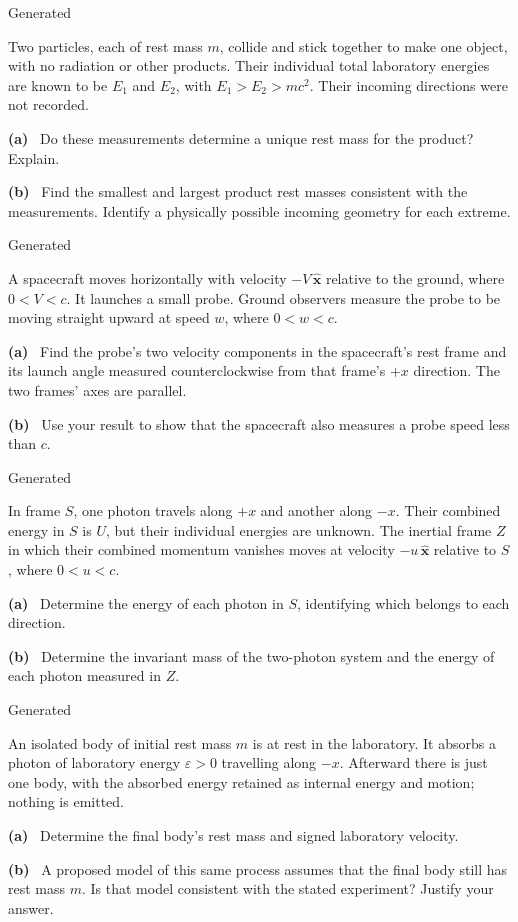 \documentclass[12pt,letterpaper]{article}
\newcommand{\question}[1]{\noindent{\large\bfseries #1.}\hfill{\small Generated}\par\medskip}
\newcommand{\partlabel}[1]{\noindent\textbf{(#1)}\ }
\begin{document}
\question{9}
Two particles, each of rest mass $m$, collide and stick together to make one
object, with no radiation or other products. Their individual total laboratory
energies are known to be $E_1$ and $E_2$, with $E_1>E_2>mc^2$.
Their incoming directions were not recorded.

\partlabel{a} Do these measurements determine a unique rest mass for the
product? Explain.
\vfill

\partlabel{b} Find the smallest and largest product rest masses consistent
with the measurements. Identify a physically possible incoming geometry for
each extreme.
\vfill
\newpage

\question{10}
A spacecraft moves horizontally with velocity $-V\,\hat{\mathbf x}$ relative
to the ground, where $0<V<c$. It launches a small probe. Ground observers
measure the probe to be moving straight upward at speed $w$, where $0<w<c$.

\partlabel{a} Find the probe's two velocity components in the spacecraft's
rest frame and its launch angle measured counterclockwise from that frame's
$+x$ direction. The two frames' axes are parallel.
\vfill

\partlabel{b} Use your result to show that the spacecraft also measures a
probe speed less than $c$.
\vfill
\newpage

\question{11}
In frame $S$, one photon travels along $+x$ and another along $-x$.
Their combined energy in $S$ is $U$, but their individual energies are unknown.
The inertial frame $Z$ in which their combined momentum vanishes moves at
velocity $-u\,\hat{\mathbf x}$ relative to $S$, where $0<u<c$.

\partlabel{a} Determine the energy of each photon in $S$, identifying which
belongs to each direction.
\vfill

\partlabel{b} Determine the invariant mass of the two-photon system and the
energy of each photon measured in $Z$.
\vfill
\newpage

\question{12}
An isolated body of initial rest mass $m$ is at rest in the laboratory.
It absorbs a photon of laboratory energy $\varepsilon>0$ travelling along
$-x$. Afterward there is just one body, with the absorbed energy retained as
internal energy and motion; nothing is emitted.

\partlabel{a} Determine the final body's rest mass and signed laboratory
velocity.
\vfill

\partlabel{b} A proposed model of this same process assumes that the final
body still has rest mass $m$. Is that model consistent with the stated
experiment? Justify your answer.
\vfill
\end{document}
